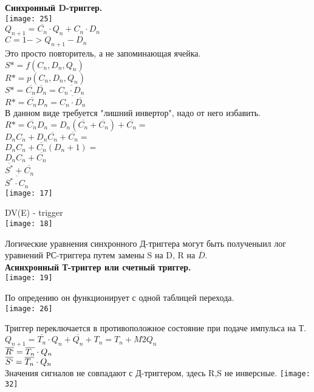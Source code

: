 \textbf {Синхронный D-триггер.}\\
\texttt{[image: 25]}\\
$Q_{n+1} = \overline{C_n} \cdot Q_n + C_n \cdot D_n $\\
$C = 1  -> Q_{n+1} - D_n $\\


Это просто повторитель, а не запоминающая ячейка.\\
$S* = f(C_n, D_n,Q_n) $\\
$R* = p(C_n, D_n,Q_n) $\\
$S* = \overline{C_n} \overline{D_n} = \overline{C_n \cdot D_n} $\\
$R* = \overline{C_n} D_n = \overline{C_n \cdot \overline{D_n}} $\\
В данном виде требуется "лишний инвертор", надо от него избавить.\\
$R* = \overline{C_n} D_n = D_n(\overline{C_n} + \overline{C_n}) + \overline{C_n} = $\\
$D_n C_n  + D_n \overline{ C_n} + \overline{C_n} = $\\
$ D_n C_n  + \overline{C_n}(D_n + 1) = $\\
$D_n C_n + \overline{C_n}  $\\
$\overline{S^*}  + \overline{C_n}$ \\
$ \overline{S^* \cdot C_n}$\\
\texttt{[image: 17]}

DV(E) - trigger\\
\texttt{[image: 18]}

Логические уравнения синхронного Д-триггера могут быть полученыил лог уравнений РС-триггера путем замены S на D, R на $\overline{D}$.\\
\newpage
\textbf {Асинхронный Т-триггер или счетный триггер.}\\
\texttt{[image: 19]}

По опредению он функционирует с одной таблицей перехода. \\
\texttt{[image: 26]}

Триггер переключается в противоположное состояние при подаче импульса на Т.\\
$Q_{n+1} = \overline{T_n} \cdot Q_n + \overline{Q_n} + T_n = T_n +M2 Q_n $\\
$\overline{R`} = \overline{T_n} \cdot Q_n$\\
$\overline{S`} = \overline{T_n} \cdot Q_n$\\
\newpage
Значения сигналов не совпадают с Д-триггером, здесь R,S не инверсные.
\texttt{[image: 32]}\\

